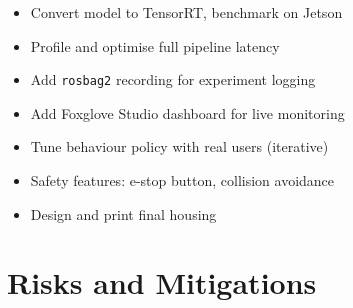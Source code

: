 \documentclass[11pt,a4paper]{article}
\begin{document}
\begin{milestonebox}[title={Deliverable: Robust, low-latency, demo-ready prototype}]
\begin{itemize}[leftmargin=1.5em, nosep]
  \item Convert model to TensorRT, benchmark on Jetson
  \item Profile and optimise full pipeline latency
  \item Add \texttt{rosbag2} recording for experiment logging
  \item Add Foxglove Studio dashboard for live monitoring
  \item Tune behaviour policy with real users (iterative)
  \item Safety features: e-stop button, collision avoidance
  \item Design and print final housing
\end{itemize}
\end{milestonebox}


\section{Risks and Mitigations}
\label{sec:risks}
\end{document}
